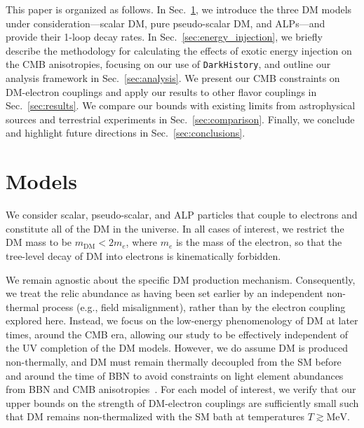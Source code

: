\documentclass[aps,prd,twocolumn,showpacs,superscriptaddress,nofootinbib,preprintnumbers]{revtex4-2}
\begin{document}
This paper is organized as follows. 
In Sec.~\ref{sec:models}, we introduce the three DM models under consideration---scalar DM, pure pseudo-scalar DM, and ALPs---and provide their 1-loop decay rates. 
In Sec.~\ref{sec:energy_injection}, we briefly describe the methodology for calculating the effects of exotic energy injection on the CMB anisotropies, focusing on our use of \texttt{DarkHistory}, and outline our analysis framework in Sec.~\ref{sec:analysis}.
We present our CMB constraints on DM-electron couplings and apply our results to other flavor couplings in Sec.~\ref{sec:results}.
We compare our bounds with existing limits from astrophysical sources and terrestrial experiments in Sec.~\ref{sec:comparison}.
Finally, we conclude and highlight future directions in Sec.~\ref{sec:conclusions}.

\section{Models}
\label{sec:models}

We consider scalar, pseudo-scalar, and ALP particles that couple to electrons and constitute all of the DM in the universe.
In all cases of interest, we restrict the DM mass to be $m_\mathrm{DM} < 2 m_e$, where $m_e$ is the mass of the electron, so that the tree-level decay of DM into electrons is kinematically forbidden.

We remain agnostic about the specific DM production mechanism. Consequently, we treat the relic abundance as having been set earlier by an independent non-thermal process (e.g., field misalignment), rather than by the electron coupling explored here.
Instead, we focus on the low-energy phenomenology of DM at later times, around the CMB era, allowing our study to be effectively independent of the UV completion of the DM models. However, we do assume DM is produced non-thermally, and DM must remain thermally decoupled from the SM before and around the time of BBN to avoid constraints on light element abundances from BBN and CMB anisotropies~\cite{Boehm:2002yz,Serpico:2004nm,Nollett:2013pwa,Steigman:2014pfa,Nollett:2014lwa,Escudero:2018mvt,Sabti:2019mhn,Giovanetti:2021izc,An:2022sva,An:2024nsw}.
For each model of interest, we verify that our upper bounds on the strength of DM-electron couplings are sufficiently small such that DM remains non-thermalized with the SM bath at temperatures $T \gtrsim \mathrm{MeV}$.
\end{document}
